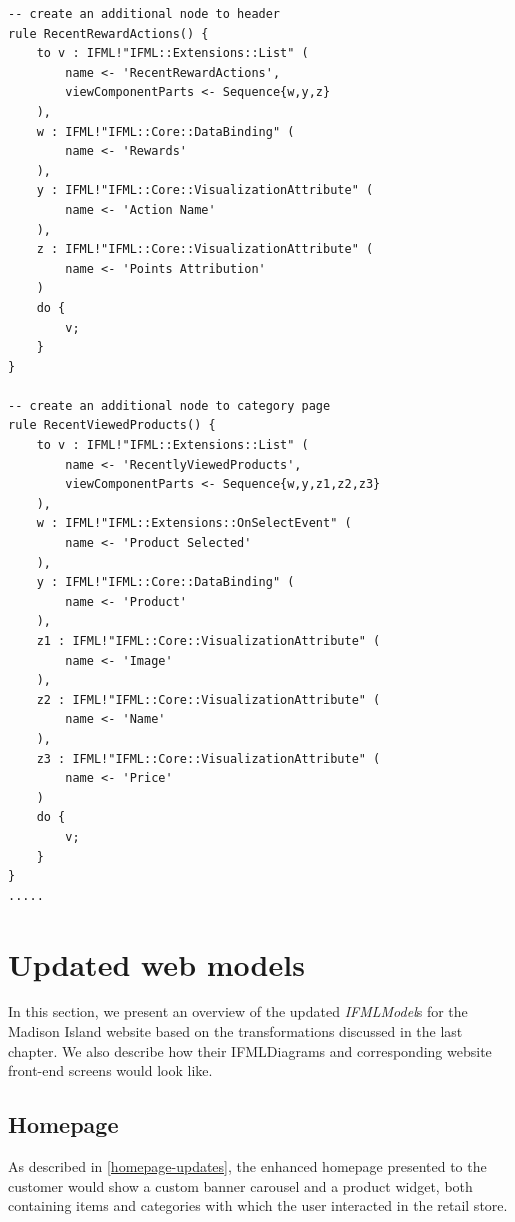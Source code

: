 \begin{lstlisting}[breaklines,style=AMMA,language=ATL,mathescape,rulesepcolor=\color{black},caption={ A fragment of the transformation},captionpos=b, aboveskip=0.2cm, belowskip=0cm, label={lst:IFMLRUD2IFML}]
-- create an additional node to header
rule RecentRewardActions() {
	to v : IFML!"IFML::Extensions::List" (
		name <- 'RecentRewardActions',
		viewComponentParts <- Sequence{w,y,z}
	),
	w : IFML!"IFML::Core::DataBinding" (
		name <- 'Rewards'
	),
	y : IFML!"IFML::Core::VisualizationAttribute" (
		name <- 'Action Name'
	),
	z : IFML!"IFML::Core::VisualizationAttribute" (
		name <- 'Points Attribution'
	)
	do {
		v;
	}
}

-- create an additional node to category page
rule RecentViewedProducts() {
	to v : IFML!"IFML::Extensions::List" (
		name <- 'RecentlyViewedProducts',
		viewComponentParts <- Sequence{w,y,z1,z2,z3}
	),
	w : IFML!"IFML::Extensions::OnSelectEvent" (
		name <- 'Product Selected'
	),
	y : IFML!"IFML::Core::DataBinding" (
		name <- 'Product'
	),
	z1 : IFML!"IFML::Core::VisualizationAttribute" (
		name <- 'Image'
	),
	z2 : IFML!"IFML::Core::VisualizationAttribute" (
		name <- 'Name'
	),
	z3 : IFML!"IFML::Core::VisualizationAttribute" (
		name <- 'Price'
	)
	do {
		v;
	}
}
.....
\end{lstlisting}
\vspace{0.5cm}


\newpage
\section{Updated web models}

In this section, we present an overview of the updated \textit{IFMLModel}s for the Madison Island website based on the transformations discussed in the last chapter. We also describe how their IFMLDiagrams and corresponding website front-end screens would look like.

\subsection{Homepage}

As described in \ref{homepage-updates}, the enhanced homepage presented to the customer would show a custom banner carousel and a product widget, both containing items and categories with which the user interacted in the retail store.


